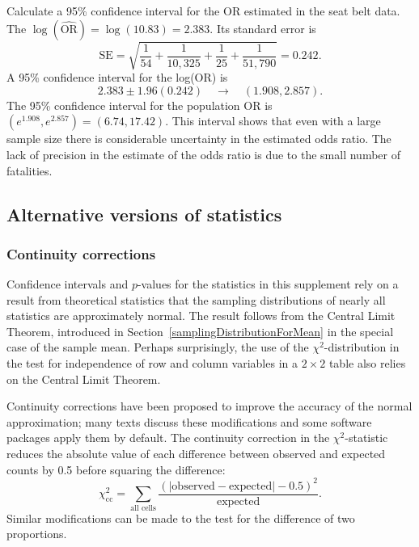 \begin{examplewrap}
  \begin{nexample}{Calculate a 95\% confidence interval for the OR estimated in the seat belt data.}
    The $\log(\widehat{\text{OR}}) = \log(10.83) = 2.383$.   Its standard error is
    \[
      \text{SE} = \sqrt{\frac{1}{54} + \frac{1}{10,325} 
   + \frac{1}{25} + \frac{1}{51,790}} = 0.242.
 \]
A 95\% confidence interval for the log(OR) is 
\[
      2.383 \pm 1.96(0.242) \quad \to \quad (1.908, 2.857).
\]
    The 95\% confidence interval for the population OR is $(e^{1.908}, e^{2.857}) = (6.74, 17.42)$.  This interval shows that even with a large sample size there is considerable uncertainty in the estimated odds ratio.  The lack of precision in the estimate of the odds ratio is due to the small number of fatalities.
  \end{nexample}
\end{examplewrap}

\subsection{Alternative versions of statistics}
\label{alternativeTestStatisticsBinaryData}

\subsubsection{Continuity corrections}

Confidence intervals and $p$-values for the statistics in this supplement rely on a result from theoretical statistics that the sampling distributions of nearly all statistics are approximately normal.  The result follows from the Central Limit Theorem, introduced in Section~\ref{samplingDistributionForMean} in the special case of the sample mean. Perhaps surprisingly, the use of the $\chi^2$-distribution in the test for independence of row and column variables in a $2 \times 2$ table also relies on the Central Limit Theorem.

Continuity corrections have been proposed to improve the accuracy of the normal approximation;  many texts discuss these modifications and some software packages apply them by default.   The continuity correction in the $\chi^2$-statistic reduces the absolute value of each difference between observed and expected counts by 0.5 before squaring the difference: \[\chi^2_{\text{cc}} = \sum_{\text{all cells}} \frac{(|\text{observed} - \text{expected}| - 0.5)^2}{\text{expected}}. \]
Similar modifications can be made to the test for the difference of two proportions.

